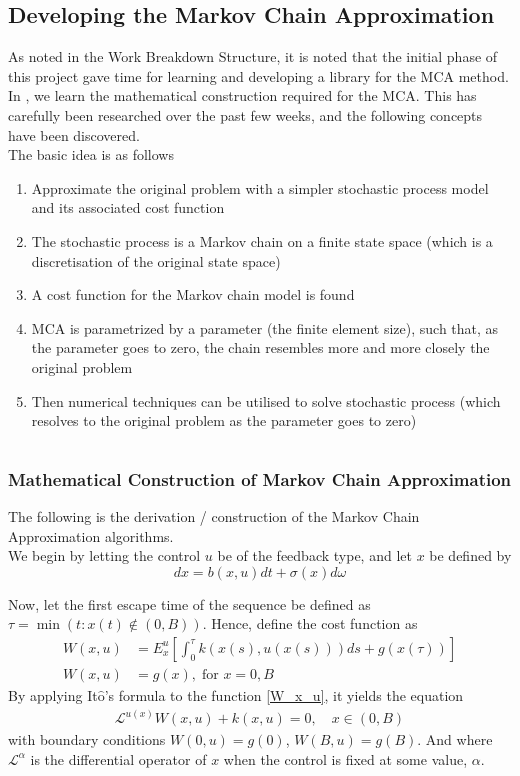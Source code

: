 \documentclass[11pt,draftd]{article}
\newcommand{\Lagr}{\mathcal{L}}
\begin{document}
\subsection{Developing the Markov Chain Approximation}
As noted in the Work Breakdown Structure, it is noted that the initial phase of this project gave time for learning and developing a library for the MCA method. In \cite{kushner}, we learn the mathematical construction required for the MCA. This has carefully been researched over the past few weeks, and the following concepts have been discovered. \\

\noindent The basic idea is as follows
\begin{enumerate}
	\item Approximate the original problem with a simpler stochastic process model and its associated cost function
	\item The stochastic process is a Markov chain on a finite state space (which is a discretisation of the original state space)
	\item A cost function for the Markov chain model is found
	\item MCA is parametrized by a parameter (the finite element size), such that, as the parameter goes to zero, the chain resembles more and more closely the original problem
	\item Then numerical techniques can be utilised to solve stochastic process (which resolves to the original problem as the parameter goes to zero)
\end{enumerate}
\[\]
\subsubsection{Mathematical Construction of Markov Chain Approximation}
The following is the derivation / construction of the Markov Chain Approximation algorithms. \\

\noindent We begin by letting the control $ u $ be of the feedback type, and let $ x $ be defined by
\begin{equation}\label{Eq_PduDefinition1D}
	dx = b(x,u) dt + \sigma(x)d\omega
\end{equation}

\noindent Now, let the first escape time of the sequence be defined as $\tau = \min\left(t : x(t)  \notin \left(0, B\right)  \right) $. Hence, define the cost function as
\begin{align}\label{W_x_u}
	W(x,u) &= E_{x}^{u}\left[\int_{0}^{\tau}k(x(s),u(x(s)))ds + g(x(\tau))\right] \\
	W(x,u) &= g(x),\; \text{for } x=0,B
\end{align}
By applying It$\hat{\text{o}}$'s formula to the function \eqref{W_x_u}, it yields the equation
\begin{align}\label{Eq_Lagrange1D}
	\Lagr^{u(x)}W(x,u) + k(x,u) = 0, \quad x\in(0,B)
\end{align}
with boundary conditions $ W(0,u) = g(0) $, $ W(B,u) = g(B) $. And where $ \Lagr^{\alpha} $ is the differential operator of $ x $ when the control is fixed at some value, $ \alpha $. \\
\end{document}
